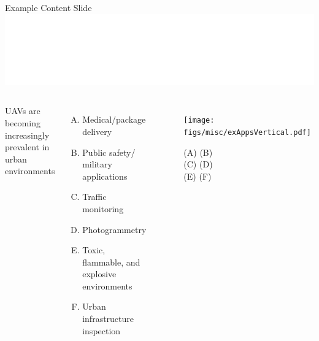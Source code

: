 \begin{frame}[t]{Example Content Slide \hfill \includegraphics[height=.5cm]{figs/uncc/whiteUNCCLogo.eps}}
    \begin{columns}[T,onlytextwidth]
            UAVs are becoming increasingly prevalent in urban environments
            \begin{enumerate}[(A)]
                \item Medical/package delivery
                \item Public safety/ military applications
                \item Traffic monitoring
                \item Photogrammetry
                \item Toxic, flammable, and explosive environments
                \item Urban infrastructure inspection
            \end{enumerate}
            \vspace{-0.5cm}
            \begin{figure}
                \centering
                \texttt{[image: figs/misc/exAppsVertical.pdf]}
                \captionsetup{labelformat=empty}
                \caption{\tiny{(A) \cite{amazonDelivery} (B) \cite{skydioMilitary} \\(C) \cite{trafficMonitor} (D) \cite{droneInspection} \\(E) \cite{propAero} (F) \cite{skydioInspection}}}
            \end{figure}
    \end{columns}
\end{frame}


